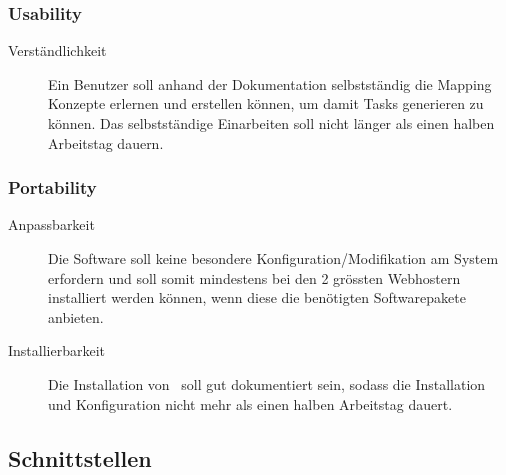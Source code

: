 		\subsubsection{Usability}
		\begin{description}
			\item[Verständlichkeit] Ein Benutzer soll anhand der Dokumentation selbstständig die Mapping Konzepte erlernen und erstellen können, um damit Tasks generieren zu können. Das selbstständige Einarbeiten soll nicht länger als einen halben Arbeitstag dauern.
		\end{description}

		
		\subsubsection{Portability}
		\begin{description}
			\item[Anpassbarkeit] Die Software soll keine besondere Konfiguration/Modifikation am System erfordern und soll somit mindestens bei den 2 grössten Webhostern installiert werden können, wenn diese die benötigten Softwarepakete anbieten.
			\item[Installierbarkeit] Die Installation von \eeppi\ soll gut dokumentiert sein, sodass die Installation und Konfiguration nicht mehr als einen halben Arbeitstag dauert.
		\end{description}

	\subsection{Schnittstellen}
